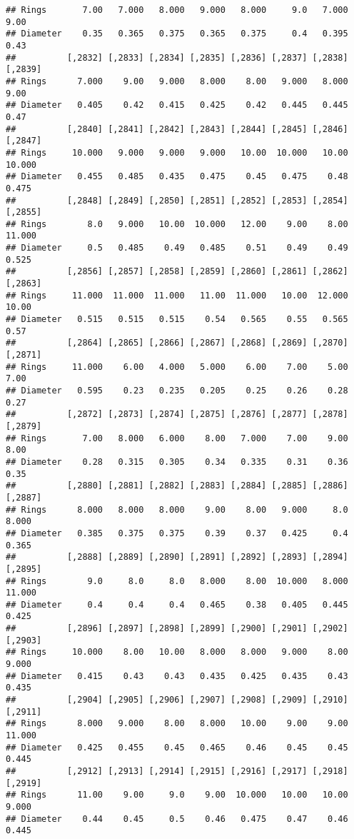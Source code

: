 \documentclass[
]{article}
\begin{document}
\begin{verbatim}
## Rings       7.00   7.000   8.000   9.000   8.000     9.0   7.000    9.00
## Diameter    0.35   0.365   0.375   0.365   0.375     0.4   0.395    0.43
##          [,2832] [,2833] [,2834] [,2835] [,2836] [,2837] [,2838] [,2839]
## Rings      7.000    9.00   9.000   8.000    8.00   9.000   8.000    9.00
## Diameter   0.405    0.42   0.415   0.425    0.42   0.445   0.445    0.47
##          [,2840] [,2841] [,2842] [,2843] [,2844] [,2845] [,2846] [,2847]
## Rings     10.000   9.000   9.000   9.000   10.00  10.000   10.00  10.000
## Diameter   0.455   0.485   0.435   0.475    0.45   0.475    0.48   0.475
##          [,2848] [,2849] [,2850] [,2851] [,2852] [,2853] [,2854] [,2855]
## Rings        8.0   9.000   10.00  10.000   12.00    9.00    8.00  11.000
## Diameter     0.5   0.485    0.49   0.485    0.51    0.49    0.49   0.525
##          [,2856] [,2857] [,2858] [,2859] [,2860] [,2861] [,2862] [,2863]
## Rings     11.000  11.000  11.000   11.00  11.000   10.00  12.000   10.00
## Diameter   0.515   0.515   0.515    0.54   0.565    0.55   0.565    0.57
##          [,2864] [,2865] [,2866] [,2867] [,2868] [,2869] [,2870] [,2871]
## Rings     11.000    6.00   4.000   5.000    6.00    7.00    5.00    7.00
## Diameter   0.595    0.23   0.235   0.205    0.25    0.26    0.28    0.27
##          [,2872] [,2873] [,2874] [,2875] [,2876] [,2877] [,2878] [,2879]
## Rings       7.00   8.000   6.000    8.00   7.000    7.00    9.00    8.00
## Diameter    0.28   0.315   0.305    0.34   0.335    0.31    0.36    0.35
##          [,2880] [,2881] [,2882] [,2883] [,2884] [,2885] [,2886] [,2887]
## Rings      8.000   8.000   8.000    9.00    8.00   9.000     8.0   8.000
## Diameter   0.385   0.375   0.375    0.39    0.37   0.425     0.4   0.365
##          [,2888] [,2889] [,2890] [,2891] [,2892] [,2893] [,2894] [,2895]
## Rings        9.0     8.0     8.0   8.000    8.00  10.000   8.000  11.000
## Diameter     0.4     0.4     0.4   0.465    0.38   0.405   0.445   0.425
##          [,2896] [,2897] [,2898] [,2899] [,2900] [,2901] [,2902] [,2903]
## Rings     10.000    8.00   10.00   8.000   8.000   9.000    8.00   9.000
## Diameter   0.415    0.43    0.43   0.435   0.425   0.435    0.43   0.435
##          [,2904] [,2905] [,2906] [,2907] [,2908] [,2909] [,2910] [,2911]
## Rings      8.000   9.000    8.00   8.000   10.00    9.00    9.00  11.000
## Diameter   0.425   0.455    0.45   0.465    0.46    0.45    0.45   0.445
##          [,2912] [,2913] [,2914] [,2915] [,2916] [,2917] [,2918] [,2919]
## Rings      11.00    9.00     9.0    9.00  10.000   10.00   10.00   9.000
## Diameter    0.44    0.45     0.5    0.46   0.475    0.47    0.46   0.445

\end{verbatim}
\end{document}
